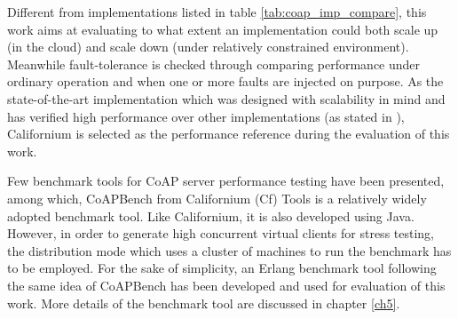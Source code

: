 Different from implementations listed in table \ref{tab:coap_imp_compare}, this work aims at evaluating to what extent an implementation could both scale up (in the cloud) and scale down (under relatively constrained environment).  Meanwhile fault-tolerance is checked through comparing performance under ordinary operation and when one or more faults are injected on purpose. As the state-of-the-art implementation which was designed with scalability in mind and has verified high performance over other implementations (as stated in \cite{kovatsch2014californium}\cite{kovatsch2015scalable}), Californium is selected as the performance reference during the evaluation of this work.

Few benchmark tools for CoAP server performance testing have been presented, among which, CoAPBench from Californium (Cf) Tools \cite{coapbench} is a relatively widely adopted benchmark tool. Like Californium, it is also developed using Java. However, in order to generate high concurrent virtual clients for stress testing, the distribution mode which uses a cluster of machines to run the benchmark has to be employed. For the sake of simplicity, an Erlang benchmark tool following the same idea of CoAPBench has been developed and used for evaluation of this work. More details of the benchmark tool are discussed in chapter \ref{ch5}.
